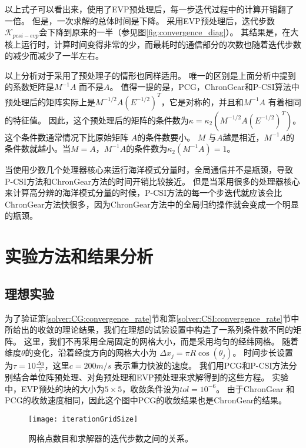 以上式子可以看出来，使用了EVP预处理后，每一步迭代过程中的计算开销翻了一倍。
但是，一次求解的总体时间是下降。 
采用EVP预处理后，迭代步数$\mathcal{K}_{pcsi-evp}$会下降到原来的一半（参见图\ref{fig:convergence_diag}）。
其结果是，在大核上运行时，计算时间变得非常的少，而最耗时的通信部分的次数也随着迭代步数的减少而减少了一半左右。


以上分析对于采用了预处理子的情形也同样适用。
唯一的区别是上面分析中提到的系数矩阵是$M^{-1}A$ 而不是$A$。
值得一提的是，PCG，ChronGear和P-CSI算法中预处理后的矩阵实际上是$M^{-1/2}A(E^{-1/2})^T$，它是对称的，并且和$M^{-1}A$ 有着相同的特征值\cite{Shewchuk1994}。
因此，这个预处理后的矩阵的条件数为$\kappa =  \kappa_2(M^{-1/2}A(E^{-1/2})^T)$。这个条件数通常情况下比原始矩阵 $A$的条件数要小。 
 $M$ 与$A$越是相近，$M^{-1}A$的条件数就越小。当$M = A$，$M^{-1}A$的条件数为$\kappa_2(M^{-1 }A ) = 1$。 

 当使用少数几个处理器核心来运行海洋模式分量时，全局通信并不是瓶颈，导致P-CSI方法和ChronGear方法的时间开销比较接近。
但是当采用很多的处理器核心来计算高分辨的海洋模式分量的时候，P-CSI方法的每一个步迭代就应该会比ChronGear方法快很多，因为ChronGear方法中的全局归约操作就会变成一个明显的瓶颈。


\section{实验方法和结果分析}
\label{precond:exp}

\subsection{理想实验}\label{precond:exp:ideal}

为了验证第\ref{solver:CG:convergence_rate}节和第\ref{solver:CSI:convergence_rate}节中所给出的收敛的理论结果，我们在理想的试验设置中构造了一系列条件数不同的矩阵。
这里，我们不再采用全局固定的网格大小，而是采用均匀的经纬网格。
随着维度$\theta$的变化，沿着经度方向的网格大小为 $\Delta x_j  = \pi R \cos (\theta_j)$。
时间步长设置为$\tau = 10\frac{\Delta y}{c}$，这里$c = 200m/s$ 表示重力快波的速度\cite{smith2010parallel}。 
我们用PCG和P-CSI方法分别结合单位阵预处理、对角预处理和EVP预处理来求解得到的这些方程。
实验中，EVP预处的块的大小为$5\times5$，收敛条件设为$tol = 10^{-6}$。 
由于ChronGear 和PCG的收敛速度相同，因此这个图中PCG的收敛结果也是ChronGear的结果。
  

\begin{figure} 
\vspace{5pt}
\centering
\texttt{[image: iterationGridSize]}
\caption[] {网格点数目和求解器的迭代步数之间的关系。\label{fig:iterationGridSizePrecond}}
\end{figure}

